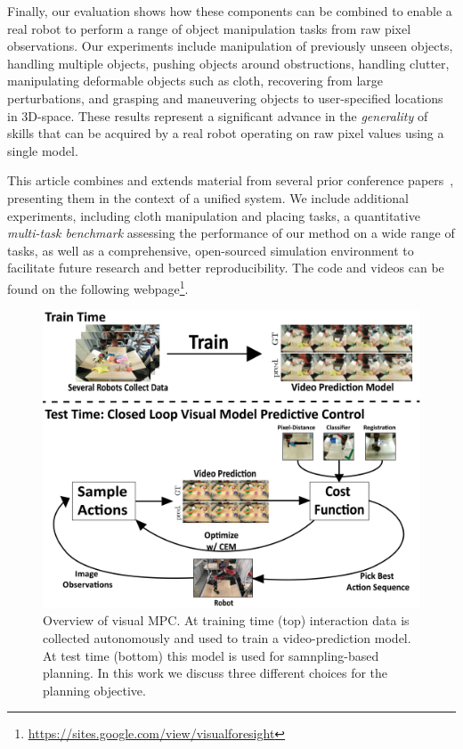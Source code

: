 Finally, our evaluation shows how these components can be combined to enable a real robot to perform a range of object manipulation tasks from raw pixel observations. Our experiments include manipulation of previously unseen objects, handling multiple objects, pushing objects around obstructions, handling clutter, manipulating deformable objects such as cloth, recovering from large perturbations, and grasping and maneuvering objects to user-specified locations in 3D-space. These results represent a significant advance in the \emph{generality} of skills that can be acquired by a real robot operating on raw pixel values using a single model.

This article combines and extends material from several prior conference papers~\cite{foresight,sna,ebert2018robustness,flo}, presenting them in the context of a unified system. We include additional experiments, including cloth manipulation and placing tasks, a quantitative \emph{multi-task benchmark} assessing the performance of our method on a wide range of tasks, as well as a comprehensive, open-sourced simulation environment to facilitate future research and better reproducibility. The code and videos can be found on the following webpage\footnote{\url{https://sites.google.com/view/visualforesight}}.

\begin{figure}[t]
\centering
\includegraphics[width=\columnwidth,trim={0mm 0 0 0},clip]{images_general/overview_roughdraft.png}
\caption{\small{Overview of visual MPC. At training time (top) interaction data is collected autonomously and used to train a video-prediction model. At test time (bottom) this model is used for samnpling-based planning. In this work we discuss three different choices for the planning objective.}}
\label{fig:overview}
\end{figure}




 





